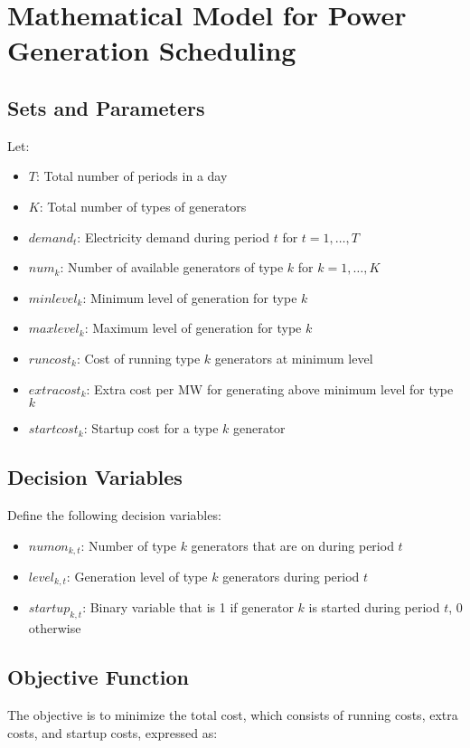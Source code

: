 \documentclass{article}
\begin{document}
\section*{Mathematical Model for Power Generation Scheduling}

\subsection*{Sets and Parameters}
Let:
\begin{itemize}
    \item \( T \): Total number of periods in a day
    \item \( K \): Total number of types of generators
    \item \( demand_{t} \): Electricity demand during period \( t \) for \( t = 1, \ldots, T \)
    \item \( num_{k} \): Number of available generators of type \( k \) for \( k = 1, \ldots, K \)
    \item \( minlevel_{k} \): Minimum level of generation for type \( k \)
    \item \( maxlevel_{k} \): Maximum level of generation for type \( k \)
    \item \( runcost_{k} \): Cost of running type \( k \) generators at minimum level
    \item \( extracost_{k} \): Extra cost per MW for generating above minimum level for type \( k \)
    \item \( startcost_{k} \): Startup cost for a type \( k \) generator
\end{itemize}

\subsection*{Decision Variables}
Define the following decision variables:
\begin{itemize}
    \item \( numon_{k,t} \): Number of type \( k \) generators that are on during period \( t \)
    \item \( level_{k,t} \): Generation level of type \( k \) generators during period \( t \)
    \item \( startup_{k,t} \): Binary variable that is 1 if generator \( k \) is started during period \( t \), 0 otherwise
\end{itemize}

\subsection*{Objective Function}
The objective is to minimize the total cost, which consists of running costs, extra costs, and startup costs, expressed as:
\end{document}
